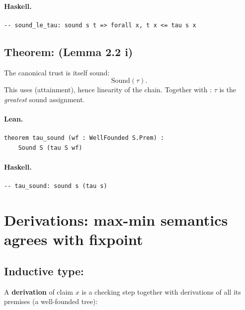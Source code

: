 \documentclass[11pt,a4paper]{article}
\begin{document}
\paragraph{Haskell.}
\begin{lstlisting}[style=haskell]
-- sound_le_tau: sound s t => forall x, t x <= tau s x
\end{lstlisting}


\subsection{Theorem:  (Lemma 2.2 i)}

\begin{thm}
The canonical trust is itself sound:
\[
  \mathrm{Sound}(\tau).
\]
This uses  (attainment), hence linearity of the
chain.  Together with : $\tau$ is the \emph{greatest}
sound assignment.
\end{thm}

\paragraph{Lean.}
\begin{lstlisting}[style=lean]
theorem tau_sound (wf : WellFounded S.Prem) :
    Sound S (tau S wf)
\end{lstlisting}

\paragraph{Haskell.}
\begin{lstlisting}[style=haskell]
-- tau_sound: sound s (tau s)
\end{lstlisting}

\section{Derivations: max-min semantics agrees with fixpoint}

\subsection{Inductive type: }

\begin{defn}[Derivation]
A \textbf{derivation} of claim $x$ is a checking step together with
derivations of all its premises (a well-founded tree):
\end{defn}
\end{document}
